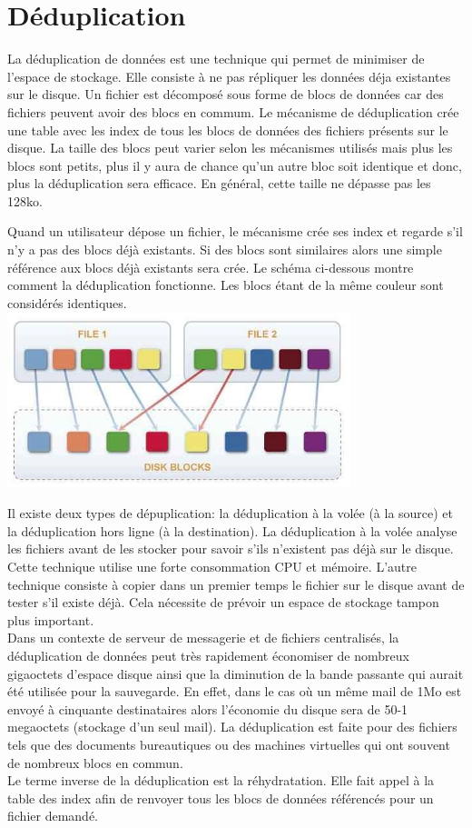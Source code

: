 \documentclass[a4paper]{report}
\begin{document}
	\chapter{Déduplication}
	La déduplication de données est une technique qui permet de minimiser de l'espace de stockage. Elle consiste à ne pas répliquer les données déja existantes sur le disque. Un fichier est décomposé sous forme de blocs de données car des fichiers peuvent avoir des blocs en commum. Le mécanisme de déduplication crée une table avec les index de tous les blocs de données des fichiers présents sur le disque. La taille des blocs peut varier selon les mécanismes utilisés mais plus les blocs sont petits, plus il y aura de chance qu'un autre bloc soit identique et donc, plus la déduplication sera efficace. En général, cette taille ne dépasse pas les 128ko.
 
 Quand un utilisateur dépose un fichier, le mécanisme crée ses index et regarde s'il n'y a pas des blocs déjà existants. Si des blocs sont similaires alors une simple référence aux blocs déjà existants sera crée. Le schéma ci-dessous montre comment la déduplication fonctionne. Les blocs étant de la même couleur sont considérés identiques.\\
\includegraphics[width=10cm]{img/deduplication.jpg}

Il existe deux types de dépuplication: la déduplication à la volée (à la source) et la déduplication hors ligne (à la destination). La déduplication à la volée analyse les fichiers avant de les stocker pour savoir s'ils n'existent pas déjà sur le disque. Cette technique utilise une forte consommation CPU et mémoire. L'autre technique consiste à copier dans un premier temps le fichier sur le disque avant de tester s'il existe déjà. Cela nécessite de prévoir un espace de stockage tampon plus important. \\

Dans un contexte de serveur de messagerie et de fichiers centralisés, la déduplication de données peut très rapidement économiser de nombreux gigaoctets d'espace disque ainsi que la diminution de la bande passante qui aurait été utilisée pour la sauvegarde. En effet, dans le cas où un même mail de 1Mo est envoyé à cinquante destinataires alors l'économie du disque sera de 50-1 megaoctets (stockage d'un seul mail). La déduplication est faite pour des fichiers tels que des documents bureautiques ou des machines virtuelles qui ont souvent de nombreux blocs en commun.\\
Le terme inverse de la déduplication est la réhydratation. Elle fait appel à la table des index afin de renvoyer tous les blocs de données référencés pour un fichier demandé.\\
\end{document}
